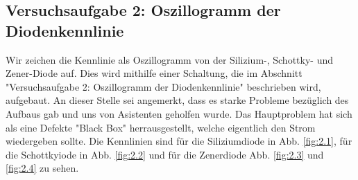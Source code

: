 \documentclass[a4paper,10pt]{article}
\numberwithin{equation}{section}
\begin{document}
\subsection{Versuchsaufgabe 2: Oszillogramm der Diodenkennlinie}
Wir zeichen die Kennlinie als Oszillogramm von der Silizium-, Schottky- und Zener-Diode auf. Dies wird mithilfe einer Schaltung, die im Abschnitt "Versuchsaufgabe 2: Oszillogramm der Diodenkennlinie" \cite{Praktikumsanleitung} beschrieben wird, aufgebaut. An dieser Stelle sei angemerkt, dass es starke Probleme bezüglich des Aufbaus gab und uns von Asistenten geholfen wurde. Das Hauptproblem hat sich als eine Defekte "Black Box" \cite{Praktikumsanleitung} herrausgestellt, welche eigentlich den Strom wiedergeben sollte. Die Kennlinien sind für die Siliziumdiode in Abb. \ref{fig:2.1}, für die Schottkyiode in Abb. \ref{fig:2.2} und für die Zenerdiode Abb. \ref{fig:2.3} und \ref{fig:2.4} zu sehen.
\end{document}

